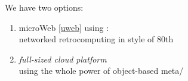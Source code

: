 \clearpage{}\secdown

We have two options:
\begin{enumerate}
  \item microWeb \ref{uweb} using \uF:\\networked retrocomputing in style of
  80th
  \item \emph{full-sized cloud platform}\\using the whole power of object-based
  meta/\F
\end{enumerate}



\secup